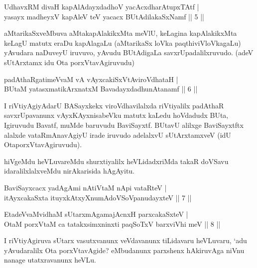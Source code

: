 
\begin{shl}
UdhavxRM divaH kapAlAdayxdadhoV yacAcxdharAtupxTAtf |\\
yasayx madheyxV kapAleV teV yacacx BUtAdilakaSxNamf \hfill || 5 ||
\end{shl}

\begin{artha}
aMtarikaSxveMbuva aMtakapAlakikxMta meVlU, keLagina kapAlakikxMta keLagU matutx eraDu kapAlagaLu (aMtarikaSx loVka paqthiviVloVkagaLu) yAvudara naDuveyU iruvuvo, yAvudu BUtAdigaLa savxrUpadalilxruvudo. (adeV sUtArxtamx idu Ota porxVtavAgiruvudu)
\end{artha}

\begin{shl}
padAthaRgatimeVvaM vA vAyxcakiSxVtAviroVdhataH |\\
BUtaM yatasxmatikArxnatxM BavadayxdadhunAtanamf \hfill || 6 ||
\end{shl}

\begin{artha}
I riVtiyAgiyAdarU BASayxkekx viroVdhavilalxda riVtiyalilx padAthaR savxrUpa\-vanunx vAyxKAyxnisabeVku matutx kaLedu hoVdadudx BUta, Igiruvudu Bavatf, muMde baruvudu BaviSayxtf. BUtavU alilxge BaviSayxtftx alalxde vataRmAnavAgiyU irade iruvudo adelalxvU sUtArxtamxveV (idU OtaporxVtavAgiruvudu).

hiVgeMdu heVLuvareMdu shurxtiyalilx heVLidadxriMda takaR doVSavu idaralilx\-lalxveMdu nirAkarisida hAgAyitu.
\end{artha}%

\begin{shl}
BaviSayxcacx yadAgAmi nAtiVtaM nApi vataRteV |\\
itAyxcakaSxta ituyxkAtxyX\s numAdoVSoV\s panudayxteV \hfill || 7 ||
\end{shl}

\begin{shl}
EtadeVvaMvidhaM sUtarxmAgamajAcnxH parxcakaSxteV |\\
OtaM porxVtaM ca tatakxsimxninxti paqSoTxV barxviVhi meV \hfill || 8 ||
\end{shl}

\begin{artha}
I riVtiyAgiruva sUtarx vasutxvanunx veVdavanunx tiLidavaru heVLuvaru, `adu yAvudaralilx Ota porxVtavAgide? eMbudanunx parxshenx hAkiruvAga niVnu nanage utatxravanunx heVLu.
\end{artha}


